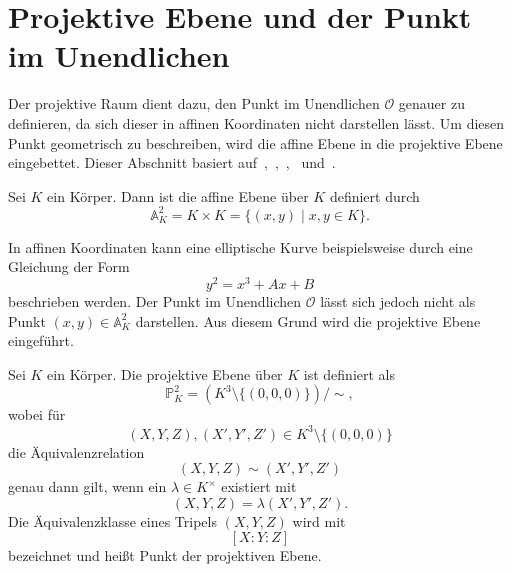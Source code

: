 \section{Projektive Ebene und der Punkt im Unendlichen}\label{subsec:punkt-im-unendlichen}
Der projektive Raum dient dazu, den Punkt im Unendlichen $\mathcal{O}$ genauer zu definieren, da sich dieser in affinen Koordinaten nicht darstellen lässt.  Um diesen Punkt geometrisch zu beschreiben, wird die
affine Ebene in die projektive Ebene eingebettet. Dieser Abschnitt basiert auf~\cite[S.~18--20]{washington08},~\cite[S.~245--246]{clader25},~\cite[S.~200--204]{forster15},~\cite[S.~15--22]{werner02} und~\cite[S.~9]{liebscher17}.

\begin{definition}
    Sei $K$ ein Körper. Dann ist die affine Ebene über $K$ definiert durch
    \[
        \mathbb{A}^2_K
        =
        K \times K
        =
        \{(x,y) \mid x,y \in K\}.
    \]
\end{definition}
In affinen Koordinaten kann eine elliptische Kurve beispielsweise durch eine Gleichung der Form
\[
    y^2 = x^3 + Ax + B
\]
beschrieben werden. Der Punkt im Unendlichen $\mathcal{O}$ lässt sich jedoch nicht als Punkt $(x,y)\in \mathbb{A}^2_K$ darstellen. Aus diesem Grund wird die projektive Ebene eingeführt.

\begin{definition}
    Sei $K$ ein Körper. Die projektive Ebene über $K$ ist definiert als
    \[
        \mathbb{P}^2_K
        =
        \left(K^3 \setminus \{(0,0,0)\}\right)/\sim,
    \]
    wobei für
    \[
        (X,Y,Z),(X',Y',Z') \in K^3 \setminus \{(0,0,0)\}
    \]
    die Äquivalenzrelation
    \[
        (X,Y,Z)\sim(X',Y',Z')
    \]
    genau dann gilt, wenn ein $\lambda \in K^\times$ existiert mit
    \[
        (X,Y,Z)
        =
        \lambda(X',Y',Z').
    \]
    Die Äquivalenzklasse eines Tripels $(X,Y,Z)$ wird mit
    \[
        [X:Y:Z]
    \]
    bezeichnet und heißt Punkt der projektiven Ebene.
\end{definition}

